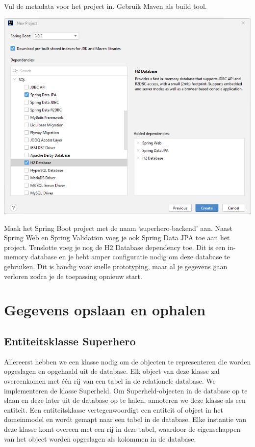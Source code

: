 Vul de metadata voor het project in. Gebruik Maven als build tool. 


\includegraphics[width=\textwidth]{./images/chapter2/new_project_metadata.png}


\begin{oefening}
Maak het Spring Boot project met de naam `superhero-backend' aan.  Naast Spring Web en Spring Validation voeg je ook Spring Data JPA toe aan het project. Tenslotte voeg je nog de H2 Database dependency toe. Dit is een in-memory database en je hebt amper configuratie nodig om deze database te gebruiken. Dit is handig voor snelle prototyping, maar al je gegevens gaan verloren zodra je de toepassing opnieuw start.
\end{oefening}

\section{Gegevens opslaan en ophalen}

\subsection{Entiteitsklasse Superhero}

Allereerst hebben we een klasse nodig om de objecten te representeren die worden opgeslagen en opgehaald uit de database. Elk object van deze klasse zal overeenkomen met één rij van een tabel in de relationele database.
We implementeren de klasse Superheld. Om Superheld-objecten in de database op te slaan en deze later uit de database op te halen, annoteren we deze klasse als een entiteit. Een entiteitsklasse vertegenwoordigt een entiteit of object in het domeinmodel en wordt gemapt naar een tabel in de database. Elke instantie van deze klasse komt overeen met een rij in deze tabel, waardoor de eigenschappen van het object worden opgeslagen als kolommen in de database.


